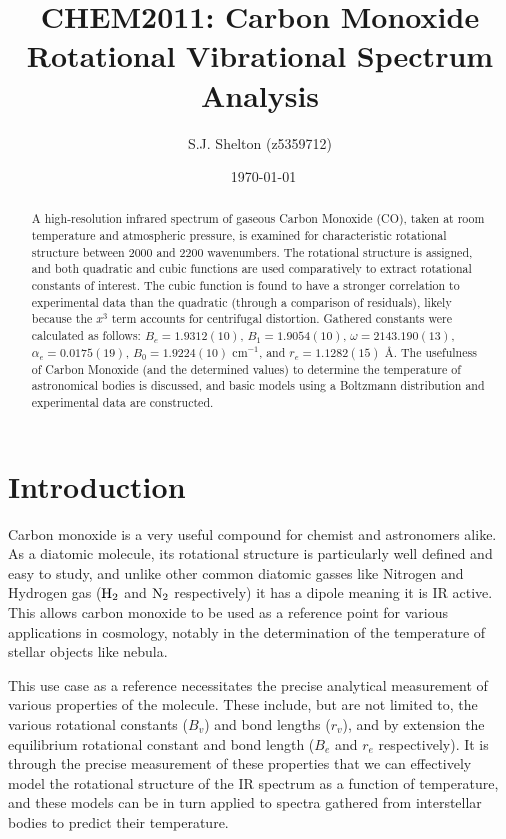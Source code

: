 \documentclass[aps,prl,reprint,10pt,amsmath,amssymb,superscriptaddress,a4paper]{revtex4-2}
\begin{document}
\title{CHEM2011: Carbon Monoxide Rotational Vibrational Spectrum Analysis}

\author{S.J. Shelton (z5359712)}
\date{\currenttime~\today}

\begin{abstract}
A high-resolution infrared spectrum of gaseous Carbon Monoxide (CO), taken at room temperature and atmospheric pressure, is examined for characteristic rotational structure between 2000 and 2200 wavenumbers. The rotational structure is assigned, and both quadratic and cubic functions are used comparatively to extract rotational constants of interest. The cubic function is found to have a stronger correlation to experimental data than the quadratic (through a comparison of residuals), likely because the $x^3$ term accounts for centrifugal distortion. Gathered constants were calculated as follows: $B_e = 1.9312(10)$, $B_1 = 1.9054(10)$, $\omega = 2143.190(13)$, $\alpha_e = 0.0175(19)$, $B_0 = 1.9224(10)$ cm$^{-1}$, and $r_e = 1.1282(15)$ \AA. The usefulness of Carbon Monoxide (and the determined values) to determine the temperature of astronomical bodies is discussed, and basic models using a Boltzmann distribution and experimental data are constructed.
\end{abstract}

\maketitle

\section{Introduction}

Carbon monoxide is a very useful compound for chemist and astronomers alike. As a diatomic molecule, its rotational structure is particularly well defined and easy to study, and unlike other common diatomic gasses like Nitrogen and Hydrogen gas ($\textnormal{H}_2$ and $\textnormal{N}_2$ respectively) it has a dipole meaning it is IR active. This allows carbon monoxide to be used as a reference point for various applications in cosmology, notably in the determination of the temperature of stellar objects like nebula.

This use case as a reference necessitates the precise analytical measurement of various properties of the molecule. These include, but are not limited to, the various rotational constants ($B_v$) and bond lengths ($r_v$), and by extension the equilibrium rotational constant and bond length ($B_e$ and $r_e$ respectively). It is through the precise measurement of these properties that we can effectively model the rotational structure of the IR spectrum as a function of temperature, and these models can be in turn applied to spectra gathered from interstellar bodies to predict their temperature.
\end{document}

